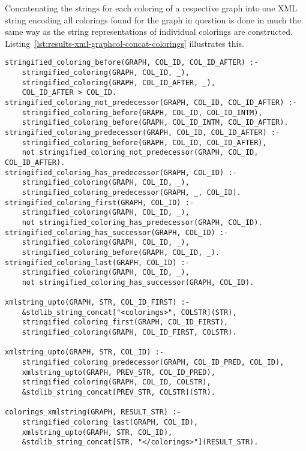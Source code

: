 Concatenating the strings for each coloring of a respective graph into one XML string encoding all colorings found for the graph in question is done in much the same way as the string representations of individual colorings are constructed. Listing~\ref{lst:results-xml-graphcol-concat-colorings} illustrates this.

\begin{lstlisting}[style=asp-code, label={lst:results-xml-graphcol-concat-colorings}, caption={Concatenating XML strings of individual colorings.}]
% Stitch individual coloring strings into one string
stringified_coloring_before(GRAPH, COL_ID, COL_ID_AFTER) :-
    stringified_coloring(GRAPH, COL_ID, _),
    stringified_coloring(GRAPH, COL_ID_AFTER, _),
    COL_ID_AFTER > COL_ID.	
stringified_coloring_not_predecessor(GRAPH, COL_ID, COL_ID_AFTER) :-
    stringified_coloring_before(GRAPH, COL_ID, COL_ID_INTM),
    stringified_coloring_before(GRAPH, COL_ID_INTM, COL_ID_AFTER).
stringified_coloring_predecessor(GRAPH, COL_ID, COL_ID_AFTER) :-
    stringified_coloring_before(GRAPH, COL_ID, COL_ID_AFTER),
    not stringified_coloring_not_predecessor(GRAPH, COL_ID, COL_ID_AFTER).
stringified_coloring_has_predecessor(GRAPH, COL_ID) :- 
    stringified_coloring(GRAPH, COL_ID, _), 
    stringified_coloring_predecessor(GRAPH, _, COL_ID).	
stringified_coloring_first(GRAPH, COL_ID) :- 
    stringified_coloring(GRAPH, COL_ID, _), 
    not stringified_coloring_has_predecessor(GRAPH, COL_ID).	
stringified_coloring_has_successor(GRAPH, COL_ID) :- 
    stringified_coloring(GRAPH, COL_ID, _), 
    stringified_coloring_before(GRAPH, COL_ID, _).	
stringified_coloring_last(GRAPH, COL_ID) :-
    stringified_coloring(GRAPH, COL_ID, _),
    not stringified_coloring_has_successor(GRAPH, COL_ID).

xmlstring_upto(GRAPH, STR, COL_ID_FIRST) :-
    &stdlib_string_concat["<colorings>", COLSTR](STR),
    stringified_coloring_first(GRAPH, COL_ID_FIRST),
    stringified_coloring(GRAPH, COL_ID_FIRST, COLSTR).

xmlstring_upto(GRAPH, STR, COL_ID) :-
    stringified_coloring_predecessor(GRAPH, COL_ID_PRED, COL_ID),
    xmlstring_upto(GRAPH, PREV_STR, COL_ID_PRED),
    stringified_coloring(GRAPH, COL_ID, COLSTR),
    &stdlib_string_concat[PREV_STR, COLSTR](STR).

colorings_xmlstring(GRAPH, RESULT_STR) :-
    stringified_coloring_last(GRAPH, COL_ID),
    xmlstring_upto(GRAPH, STR, COL_ID),
    &stdlib_string_concat[STR, "</colorings>"](RESULT_STR).
\end{lstlisting}  

